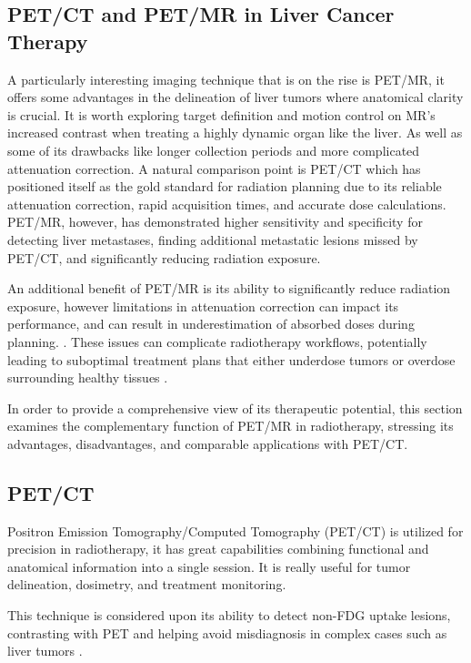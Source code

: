 \documentclass[11pt]{article} %
\begin{document}
\begin{multicols}{2}
\section{PET/CT and PET/MR in Liver Cancer Therapy}

A particularly interesting imaging technique that is on the rise is PET/MR, it offers some advantages in the delineation of liver tumors where anatomical clarity is crucial. It is worth exploring target definition and motion control on MR's increased contrast when treating a highly dynamic organ like the liver. As well as some of its drawbacks like longer collection periods and more complicated attenuation correction. A natural comparison point is PET/CT which has positioned itself as the gold standard for radiation planning due to its reliable attenuation correction, rapid acquisition times, and accurate dose calculations. PET/MR, however, has demonstrated higher sensitivity and specificity for detecting liver metastases, finding additional metastatic lesions missed by PET/CT, and significantly reducing radiation exposure. \cite{frontiers2021, springer2014}

An additional benefit of PET/MR is its ability to significantly reduce radiation exposure, however limitations in attenuation correction can impact its performance, and can result in underestimation of absorbed doses during planning. \cite{ajr2012, pmc2017}.
These issues can complicate radiotherapy workflows, potentially leading to suboptimal treatment plans that either underdose tumors or overdose surrounding healthy tissues \cite{pmc2023}.

In order to provide a comprehensive view of its therapeutic potential, this section examines the complementary function of PET/MR in radiotherapy, stressing its advantages, disadvantages, and comparable applications with PET/CT.

\subsection{PET/CT}
Positron Emission Tomography/Computed Tomography (PET/CT) is utilized for precision in radiotherapy, it has great capabilities combining functional and anatomical information into a single session. It is really useful for tumor delineation, dosimetry, and treatment monitoring.

This technique is considered upon its ability to detect non-FDG uptake lesions, contrasting with PET and helping avoid misdiagnosis in complex cases such as liver tumors \cite{yan2024, decazes2021}.



\end{multicols}
\end{document}
